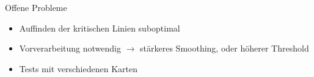 \begin{frame}{Offene Probleme}
  \begin{itemize}
   \item Auffinden der kritischen Linien suboptimal
   \item Vorverarbeitung notwendig $\to$ stärkeres Smoothing, oder höherer Threshold
   \item Tests mit verschiedenen Karten
  \end{itemize}

 
\end{frame}
